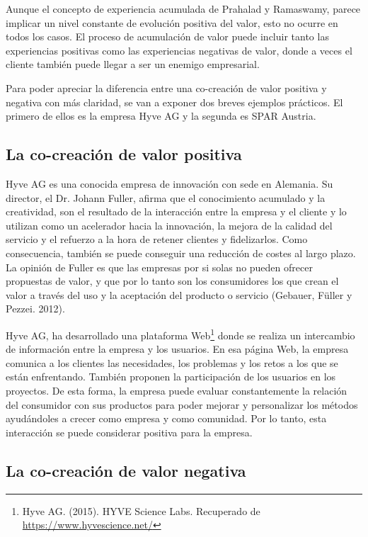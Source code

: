Aunque el concepto de experiencia acumulada de Prahalad y Ramaswamy, parece implicar un nivel constante de evolución positiva del valor, esto no ocurre en todos los casos. El proceso de acumulación de valor puede incluir tanto las experiencias positivas como las experiencias negativas de valor, donde a veces el cliente también puede llegar a ser un enemigo empresarial.

Para poder apreciar la diferencia entre una co-creación de valor positiva y negativa con más claridad, se van a exponer dos breves ejemplos prácticos. El primero de ellos es la empresa Hyve AG y la segunda es SPAR Austria.

\subsection{La co-creación de valor positiva}

Hyve AG es una conocida empresa de innovación con sede en Alemania. Su director, el Dr. Johann Fuller, afirma que el conocimiento acumulado y la creatividad, son el resultado de la interacción entre la empresa y el cliente y lo utilizan como un acelerador hacia la innovación, la mejora de la calidad del servicio y el refuerzo a la hora de retener clientes y fidelizarlos. Como consecuencia, también se puede conseguir una reducción de costes al largo plazo. La opinión de Fuller es que las empresas por si solas no pueden ofrecer propuestas de valor, y que por lo tanto son los consumidores los que crean el valor a través del uso y la aceptación del producto o servicio (Gebauer, Füller y Pezzei. 2012).

Hyve AG, ha desarrollado una plataforma Web\footnote{Hyve AG. (2015). HYVE Science Labs. Recuperado de \url{https://www.hyvescience.net/}} donde se realiza un intercambio de información entre la empresa y los usuarios. En esa página Web, la empresa comunica a los clientes las necesidades, los problemas y los retos a los que se están enfrentando. También proponen la participación de los usuarios en los proyectos. De esta forma, la empresa puede evaluar constantemente la relación del consumidor con sus productos para poder mejorar y personalizar los métodos ayudándoles a crecer como empresa y como comunidad. Por lo tanto, esta interacción se puede considerar positiva para la empresa.

\subsection{La co-creación de valor negativa}


